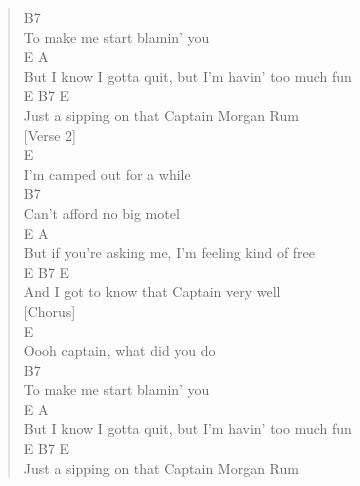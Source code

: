 \documentclass[11pt]{article}
\begin{document}
\begin{verse}
\hspace*{26em}B7\\
To make me start blamin' you\\
\hspace*{4em}E                            A\\
But I know I gotta quit, but I'm havin' too much fun\\
\hspace*{9em}E              B7            E\\
Just a sipping on that Captain Morgan Rum\\
\vspace*{1em}
\vspace*{1em}
\vspace*{1em}
[Verse 2]\\
E\\
I'm camped out for a while\\
\hspace*{22em}B7\\
Can't afford no big motel\\
\hspace*{6em}E                      A\\
But if you're asking me, I'm feeling kind of free\\
\hspace*{8em}E               B7          E\\
And I got to know that Captain very well\\
\vspace*{1em}
\vspace*{1em}
\vspace*{1em}
[Chorus]\\
E\\
Oooh captain, what did you do\\
\hspace*{25em}B7\\
To make me start blamin' you\\
\hspace*{4em}E                            A\\
But I know I gotta quit, but I'm havin' too much fun\\
\hspace*{9em}E              B7            E\\
Just a sipping on that Captain Morgan Rum\\
\vspace*{1em}
\vspace*{1em}
\vspace*{1em}

\end{verse}
\end{document}
